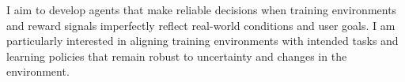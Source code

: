 \documentclass[10pt]{developercv} %
\begin{document}





I aim to develop agents that make reliable decisions when training environments and reward signals imperfectly reflect real-world conditions and user goals. I am particularly interested in aligning training environments with intended tasks and learning policies that remain robust to uncertainty and changes in the environment. \\
\end{document}
